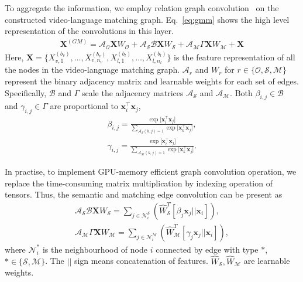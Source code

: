 \documentclass[10pt,twocolumn,letterpaper]{article}
\begin{document}
To aggregate the information, we employ relation graph convolution~\cite{schlichtkrull2017modeling} on the constructed video-language matching graph. Eq.~\ref{eq:gmm} shows the high level representation of the convolutions in this layer.
\begin{align} \label{eq:gmm} 
   \mathbf{X}^{(GM)}\! =\! \mathcal{A}_\mathcal{O} \mathbf{X} W_\mathcal{O}\! +\! \mathcal{A}_\mathcal{S} \mathcal{B} \mathbf{X}  W_\mathcal{S}\! +\! \mathcal{A}_\mathcal{M} \Gamma \mathbf{X} W_\mathcal{M}\! +\! \mathbf{X}
\end{align}
Here, $\mathbf{X} = \{{X_{v,1}^{(b_v)},\dots,X_{v,n_v}^{(b_v)},X_{l,1}^{(b_l)},\dots,X_{l,n_l}^{(b_l)}}\}$ is the feature representation of all the nodes in the video-language matching graph. 
$\mathcal{A}_{r}$ and $W_{r}$ for $r\in \{ \mathcal{O},\mathcal{S},\mathcal{M}\}$ represent the binary adjacency matrix and learnable weights for each set of edges. 
Specifically, $\mathcal{B}$ and $\Gamma$ scale the adjacency matrices $\mathcal{A}_\mathcal{S}$ and $\mathcal{A}_\mathcal{M}$. Both $\beta_{i,j}\in \mathcal{B}$ and $\gamma_{i,j} \in \Gamma$ are proportional to $\mathbf{x}_i^{\top} \mathbf{x}_j$,
\begin{align}
      \beta_{i,j}= \frac{\exp{[\mathbf{x}_i^{\top} \mathbf{x}_j}]} 
      {\sum_{\mathcal{A}_\mathcal{S}(k,j)=1} \exp{[\mathbf{x}_k^{\top} \mathbf{x}_j}]}, \\
      \gamma_{i,j}= \frac{\exp{[\mathbf{x}_i^{\top} \mathbf{x}_j}]} 
      {\sum_{\mathcal{A}_\mathcal{M}(k,j)=1} \exp{[\mathbf{x}_k^{\top} \mathbf{x}_j}]}.
\end{align}

In practise, to implement GPU-memory efficient graph convolution operation, we replace the time-consuming matrix multiplication by indexing operation of tensors. 
Thus, the semantic and matching edge convolution can be present as 
\begin{align} \label{eq:gmm2} 
   \mathcal{A}_\mathcal{S} \mathcal{B} \mathbf{X}  W_\mathcal{S} = \sum_{j\in \mathcal{N}_i^\mathcal{S}} ( \hat{W}_\mathcal{S}^T [\beta_j\mathbf{x}_{j}||\mathbf{x}_{i}]), \\
   \mathcal{A}_\mathcal{M} \Gamma \mathbf{X} W_\mathcal{M} = \sum_{j\in \mathcal{N}_i^\mathcal{M}} ( \hat{W}_\mathcal{M}^T [\gamma_j\mathbf{x}_{j}||\mathbf{x}_{i}]),
\end{align}
where $\mathcal{N}_i^\mathcal{*}$ is the neighbourhood of node $i$ connected by edge with type $*$, $* \in \{\mathcal{S},\mathcal{M}\}$. The $||$ sign means concatenation of features. $\hat{W}_\mathcal{S}, \hat{W}_\mathcal{M}$ are learnable weights.
\end{document}
